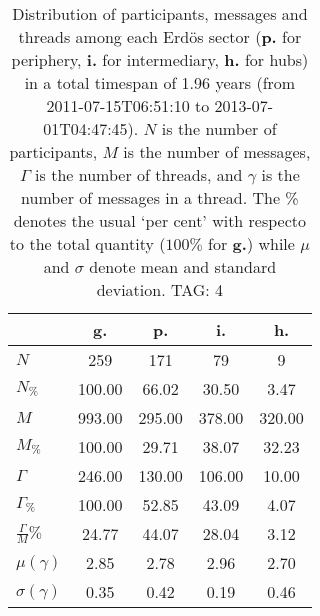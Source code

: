 \begin{table}[h!]
\begin{center}
\begin{tabular}{| l | c | c | c | c |}\hline
 & g. & p. & i. & h. \\\hline
$N$ & 259  & 171  & 79  & 9 \\\hline
$N_{\%}$ & 100.00  & 66.02  & 30.50  & 3.47 \\\hline
$M$ & 993.00  & 295.00  & 378.00  & 320.00 \\\hline
$M_{\%}$ & 100.00  & 29.71  & 38.07  & 32.23 \\\hline
$\Gamma$ & 246.00  & 130.00  & 106.00  & 10.00 \\\hline
$\Gamma_{\%}$ & 100.00  & 52.85  & 43.09  & 4.07 \\\hline
$\frac{\Gamma}{M}\%$ & 24.77  & 44.07  & 28.04  & 3.12 \\\hline
$\mu(\gamma)$ & 2.85  & 2.78  & 2.96  & 2.70 \\\hline
$\sigma(\gamma)$ & 0.35  & 0.42  & 0.19  & 0.46 \\\hline
\end{tabular}
\caption{Distribution of participants, messages and threads among each Erd\"os sector ({\bf p.} for periphery, {\bf i.} for intermediary, 
    {\bf h.} for hubs) in a total timespan of 1.96 years (from 2011-07-15T06:51:10 to 2013-07-01T04:47:45). $N$ is the number of participants, $M$ is the number of messages, $\Gamma$ is the number of threads, and $\gamma$ is the number of messages in a thread.
    The \% denotes the usual `per cent' with respecto to the total quantity ($100\%$ for {\bf g.})
    while $\mu$ and $\sigma$ denote mean and standard deviation. TAG: 4}
\end{center}
\end{table}